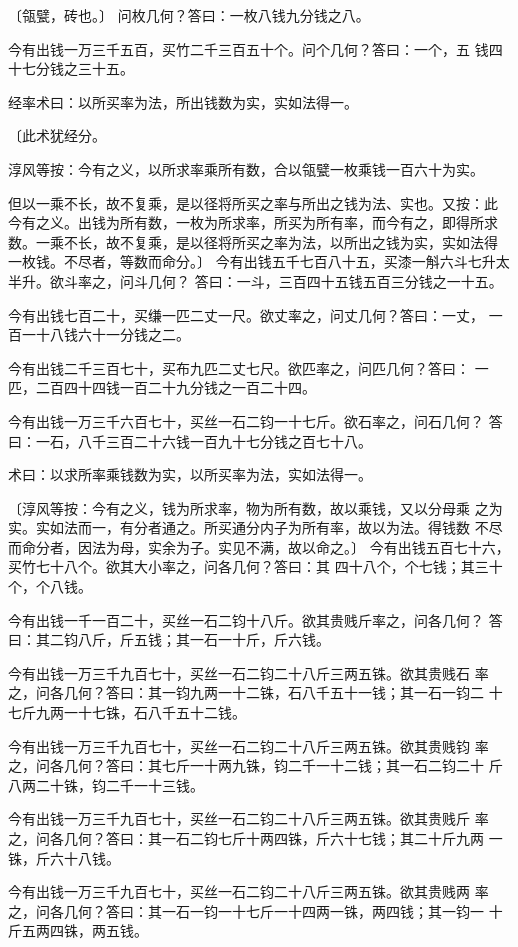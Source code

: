 \documentclass[12pt,UTF8]{ctexbook}
\begin{document}
〔瓴甓，砖也。〕 问枚几何？答曰：一枚八钱九分钱之八。

今有出钱一万三千五百，买竹二千三百五十个。问个几何？答曰：一个，五 钱四十七分钱之三十五。

经率术曰：以所买率为法，所出钱数为实，实如法得一。

〔此术犹经分。

淳风等按：今有之义，以所求率乘所有数，合以瓴甓一枚乘钱一百六十为实。

但以一乘不长，故不复乘，是以径将所买之率与所出之钱为法、实也。又按：此 今有之义。出钱为所有数，一枚为所求率，所买为所有率，而今有之，即得所求 数。一乘不长，故不复乘，是以径将所买之率为法，以所出之钱为实，实如法得 一枚钱。不尽者，等数而命分。〕 今有出钱五千七百八十五，买漆一斛六斗七升太半升。欲斗率之，问斗几何？ 答曰：一斗，三百四十五钱五百三分钱之一十五。

今有出钱七百二十，买缣一匹二丈一尺。欲丈率之，问丈几何？答曰：一丈， 一百一十八钱六十一分钱之二。

今有出钱二千三百七十，买布九匹二丈七尺。欲匹率之，问匹几何？答曰： 一匹，二百四十四钱一百二十九分钱之一百二十四。

今有出钱一万三千六百七十，买丝一石二钧一十七斤。欲石率之，问石几何？ 答曰：一石，八千三百二十六钱一百九十七分钱之百七十八。

术曰：以求所率乘钱数为实，以所买率为法，实如法得一。

〔淳风等按：今有之义，钱为所求率，物为所有数，故以乘钱，又以分母乘 之为实。实如法而一，有分者通之。所买通分内子为所有率，故以为法。得钱数 不尽而命分者，因法为母，实余为子。实见不满，故以命之。〕 今有出钱五百七十六，买竹七十八个。欲其大小率之，问各几何？答曰：其 四十八个，个七钱；其三十个，个八钱。

今有出钱一千一百二十，买丝一石二钧十八斤。欲其贵贱斤率之，问各几何？ 答曰：其二钧八斤，斤五钱；其一石一十斤，斤六钱。

今有出钱一万三千九百七十，买丝一石二钧二十八斤三两五铢。欲其贵贱石 率之，问各几何？答曰：其一钧九两一十二铢，石八千五十一钱；其一石一钧二 十七斤九两一十七铢，石八千五十二钱。

今有出钱一万三千九百七十，买丝一石二钧二十八斤三两五铢。欲其贵贱钧 率之，问各几何？答曰：其七斤一十两九铢，钧二千一十二钱；其一石二钧二十 斤八两二十铢，钧二千一十三钱。

今有出钱一万三千九百七十，买丝一石二钧二十八斤三两五铢。欲其贵贱斤 率之，问各几何？答曰：其一石二钧七斤十两四铢，斤六十七钱；其二十斤九两 一铢，斤六十八钱。

今有出钱一万三千九百七十，买丝一石二钧二十八斤三两五铢。欲其贵贱两 率之，问各几何？答曰：其一石一钧一十七斤一十四两一铢，两四钱；其一钧一 十斤五两四铢，两五钱。
\end{document}
